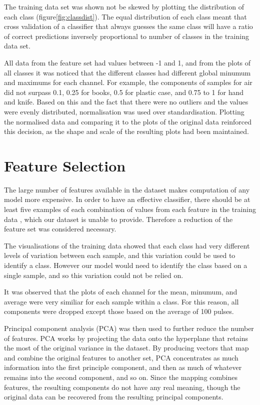 \documentclass[12pt]{article}
\begin{document}
The training data set was shown not be skewed by plotting the distribution of each class (figure\ref{fig:classdist}). The equal distribution of each class meant that cross validation of a classifier that always guesses the same class will have a ratio of correct predictions inversely proportional to number of classes in the training data set. 

All data from the feature set had values between -1 and 1, and from the plots of all classes it was noticed that the different classes had different global minumum and maximums for each channel. For example, the components of samples for air did not surpass 0.1, 0.25 for books, 0.5 for plastic case, and 0.75 to 1 for hand and knife. Based on this and the fact that there were no outliers and the values were evenly distributed, normalisation was used over standardisation. Plotting the normalised data and comparing it to the plots of the original data reinforced this decision, as the shape and scale of the resulting plots had been maintained.

\section{Feature Selection}

The large number of features available in the dataset makes computation of any model more expensive. In order to have an effective classifier, there should be at least five examples of each combination of values from each feature in the training data \cite{mincombs}, which our dataset is unable to provide. Therefore a reduction of the feature set was considered necessary.

The visualisations of the training data showed that each class had very different levels of variation between each sample, and this variation could be used to identify a class. However our model would need to identify the class based on a single sample, and so this variation could not be relied on. 

It was observed that the plots of each channel for the mean, minumum, and average were very similiar for each sample within a class. For this reason, all components were dropped except those based on the average of 100 pulses. 

Principal component analysis (PCA) was then used to further reduce the number of features. PCA works by projecting the data onto the hyperplane that retains the most of the original variance in the dataset. By producing vectors that map and combine the original features to another set, PCA concentrates as much information into the first principle component, and then as much of whatever remains into the second component, and so on. Since the mapping combines features, the resulting components do not have any real meaning, though the original data can be recovered from the resulting principal components.
\end{document}

